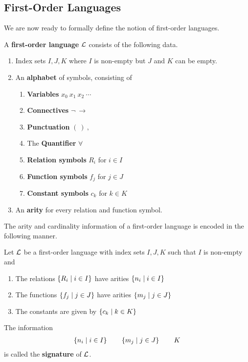 \subsection{First-Order Languages}

We are now ready to formally define the notion of first-order languages.

\begin{boxdefinition}\label{Ch2:Def:First-Order_Language}
    A \textbf{first-order language} $\mathcal{L}$ consists of the following data.
    \begin{enumerate}
        \item Index sets $I, J, K$ where $I$ is non-empty but $J$ and $K$ can be empty.
        \item An \textbf{alphabet} of symbols, consisting of
        \begin{enumerate}[noitemsep]
            \item \textbf{Variables} $x_0 \ x_1 \ x_2 \ \cdots$
            \item \textbf{Connectives} $\neg \ \to$
            \item \textbf{Punctuation} $( \ ) \ ,$
            \item The \textbf{Quantifier} $\forall$
            \item \textbf{Relation symbols} $R_i$ for $i \in I$
            \item \textbf{Function symbols} $f_j$ for $j \in J$
            \item \textbf{Constant symbols} $c_k$ for $k \in K$
        \end{enumerate}
        \item An \textbf{arity} for every relation and function symbol.
    \end{enumerate}
\end{boxdefinition}

The arity and cardinality information of a first-order language is encoded in the following manner.

\begin{boxdefinition}[Signature]
    Let $\mathcal{L}$ be a first-order language with index sets $I, J, K$ such that $I$ is non-empty and
    \begin{enumerate}
        \item The relations $\left\{ R_i \; \middle\vert \; i \in I \right\}$ have arities $\left\{ n_i \; \middle\vert \; i \in I \right\}$
        \item The functions $\left\{ f_j \; \middle\vert \; j \in J \right\}$ have arities $\left\{ m_j \; \middle\vert \; j \in J \right\}$
        \item The constants are given by $\left\{ c_k \; \middle\vert \; k \in K \right\}$
    \end{enumerate}
    The information
    \begin{align*}
        \left\{ n_i \; \middle\vert \; i \in I \right\}
        \qquad
        \left\{ m_j \; \middle\vert \; j \in J \right\}
        \qquad
        K
    \end{align*}
    is called the \textbf{signature} of $\mathcal{L}$.
\end{boxdefinition}

